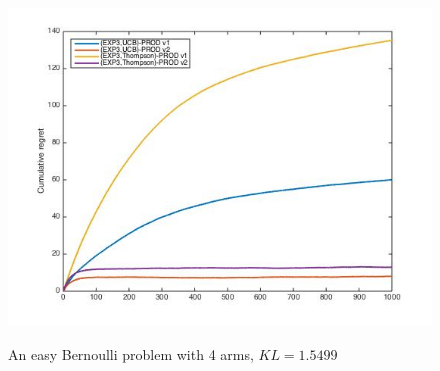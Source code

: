 \documentclass[10.5pt]{article}
\begin{document}
\begin{figure}[H]
  \includegraphics[width=\linewidth]{Stoch2_prod.jpg}
  \label{fig:awesome_image3}
\endminipage
\caption{An easy Bernoulli problem with 4 arms, $KL = 1.5499$}
\end{figure}
\end{document}
